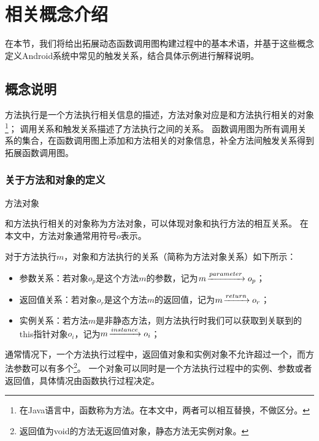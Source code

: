 \chapter{相关概念介绍}
\label{chp:definition}


在本节，我们将给出拓展动态函数调用图构建过程中的基本术语，并基于这些概念定义Android系统中常见的触发关系，结合具体示例进行解释说明。

\section{概念说明}
方法执行是一个方法执行相关信息的描述，方法对象对应是和方法执行相关的对象\footnote{在Java语言中，函数称为方法。在本文中，两者可以相互替换，不做区分。}；
调用关系和触发关系描述了方法执行之间的关系。
函数调用图为所有调用关系的集合，在函数调用图上添加和方法相关的对象信息，补全方法间触发关系得到拓展函数调用图。

\subsection{关于方法和对象的定义}

\begin{Def}
	方法对象%
\end{Def}

和方法执行相关的对象称为方法对象，可以体现对象和执行方法的相互关系。
在本文中，方法对象通常用符号$o$表示。
	

	对于方法执行$m$，对象和方法执行的关系（简称为方法对象关系）如下所示：
	\begin{itemize}
				\setlength{\itemsep}{1pt}
				\setlength{\parskip}{0pt}
				\setlength{\parsep}{0pt}
		\item 参数关系：若对象$o_p$是这个方法$m$的参数，记为$m \joinrel\xrightarrow{parameter} o_p$；%
		\item 返回值关系：若对象$o_r$是这个方法$m$的返回值，记为$m \joinrel\xrightarrow{return} o_r$；%
		\item 实例关系：若方法$m$是非静态方法，则方法执行时我们可以获取到关联到的this指针对象$o_i$，记为$m \joinrel\xrightarrow{instance} o_i$；%
	\end{itemize}

通常情况下，一个方法执行过程中，返回值对象和实例对象不允许超过一个，而方法参数可以有多个\footnote{返回值为void的方法无返回值对象，静态方法无实例对象。}。
一个对象可以同时是一个方法执行过程中的实例、参数或者返回值，具体情况由函数执行过程决定。




